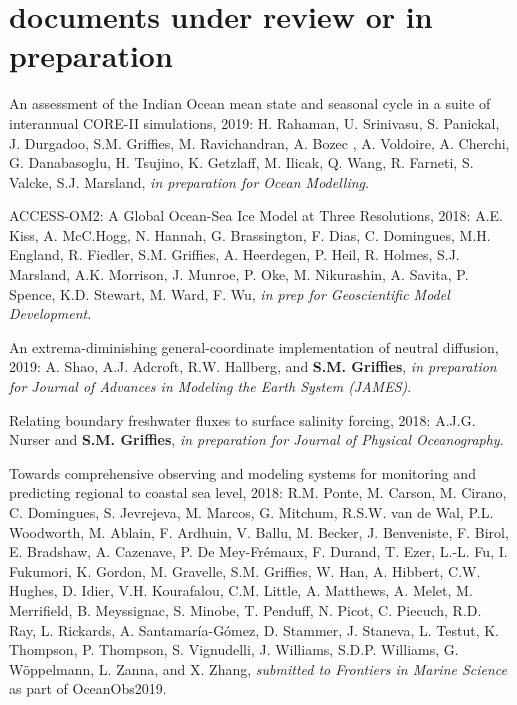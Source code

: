 \section*{\sc \color{Maroon} documents under review or in preparation}

\small 


\begin{etaremune}

\item An assessment of the Indian Ocean mean state and seasonal cycle in a suite of interannual CORE-II simulations, 2019: H. Rahaman, U. Srinivasu,  S. Panickal, J. Durgadoo, S.M. Griffies, M. Ravichandran, A. Bozec , A. Voldoire, A. Cherchi, G. Danabasoglu, H. Tsujino, K. Getzlaff, M. Ilicak, Q. Wang, R. Farneti, S. Valcke, S.J. Marsland, {\it in preparation for Ocean Modelling}.

\item ACCESS-OM2: A Global Ocean-Sea Ice Model at Three Resolutions, 2018: A.E. Kiss, A. McC.Hogg, N. Hannah, G. Brassington, F. Dias, C. Domingues, M.H. England, R. Fiedler, S.M. Grif\/f\/ies,  A. Heerdegen, P. Heil, R. Holmes, S.J. Marsland, A.K. Morrison, J. Munroe, P. Oke, M. Nikurashin, A. Savita, P. Spence, K.D. Stewart, M. Ward, F. Wu, {\it in prep for Geoscientific Model Development}.  
\item An extrema-diminishing general-coordinate implementation of neutral diffusion, 2019: A. Shao, A.J. Adcroft, R.W. Hallberg, and {\bf S.M. Grif\/f\/ies}, {\it in preparation for Journal of Advances in Modeling the Earth System (JAMES)}.

\item Relating boundary freshwater fluxes to surface salinity forcing, 2018: A.J.G. Nurser and {\bf S.M. Grif\/f\/ies}, {\it in preparation for Journal of Physical Oceanography}.

\item Towards comprehensive observing and modeling systems for monitoring and predicting regional to coastal sea level, 2018: R.M. Ponte, M. Carson, M. Cirano, C. Domingues, S. Jevrejeva, M. Marcos, G. Mitchum, R.S.W. van de Wal, P.L. Woodworth, M. Ablain, F. Ardhuin, V. Ballu, M. Becker, J. Benveniste, F. Birol, E. Bradshaw, A. Cazenave, P. De Mey-{Fr\'{e}maux}, F. Durand, T. Ezer, L.-L. Fu, I. Fukumori, K. Gordon, M. Gravelle, S.M. Grif\/f\/ies, W. Han, A. Hibbert, C.W. Hughes, D. Idier, V.H. Kourafalou, C.M. Little, A. Matthews, A. Melet, M. Merrifield, B. Meyssignac, S. Minobe, T. Penduff, N. Picot, C. Piecuch, R.D. Ray, L. Rickards, A. Santamaría-Gómez, D. Stammer, J. Staneva, L. Testut, K. Thompson, P. Thompson, S. Vignudelli, J. Williams, S.D.P. Williams, G. Wöppelmann, L. Zanna, and X. Zhang, {\it submitted to Frontiers in Marine Science} as part of OceanObs2019.



\end{etaremune}
